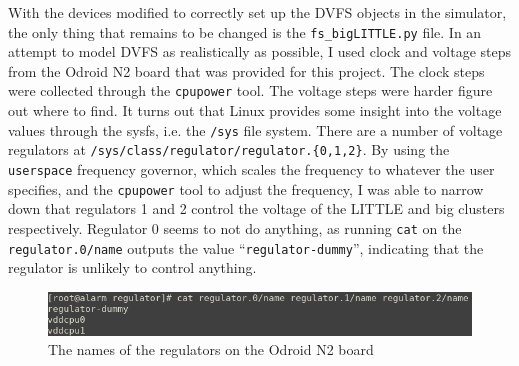     With the devices modified to correctly set up the DVFS objects in the 
    simulator, the only thing that remains to be changed is the 
    \texttt{fs\_bigLITTLE.py} file. In an attempt to model DVFS as realistically
    as possible, I used clock and voltage steps from the Odroid N2 board that
    was provided for this project. The clock steps were collected through the 
    \texttt{cpupower} tool. The voltage steps were harder figure out where to 
    find. It turns out that Linux provides some insight into the voltage values 
    through the sysfs, i.e. the \texttt{/sys} file system. There are a number of
    voltage regulators at \texttt{/sys/class/regulator/regulator.\{0,1,2\}}. By 
    using the \texttt{userspace} frequency governor, which scales the frequency 
    to whatever the user specifies, and the \texttt{cpupower} tool to adjust 
    the frequency, I was able to narrow down that regulators 1 and 2 control 
    the voltage of the LITTLE and big clusters respectively. Regulator 0
    seems to not do anything, as running \texttt{cat} on the 
    \texttt{regulator.0/name} outputs the value ``\texttt{regulator-dummy}'', 
    indicating that the regulator is unlikely to control anything.
    \begin{figure}[H]
        \centering
        \includegraphics[width=0.9\linewidth]{screenshots/odroid-stuff/regulator-names.png}
        \caption{The names of the regulators on the Odroid N2 board}
    \end{figure}

